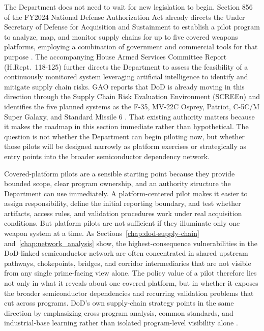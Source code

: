 The Department does not need to wait for new legislation to begin. Section 856 of the FY2024 National Defense Authorization Act already directs the Under Secretary of Defense for Acquisition and Sustainment to establish a pilot program to analyze, map, and monitor supply chains for up to five covered weapons platforms, employing a combination of government and commercial tools for that purpose \parencite{ch5_ndaa2024_sec856}. The accompanying House Armed Services Committee Report (H.Rept.\ 118-125) further directs the Department to assess the feasibility of a continuously monitored system leveraging artificial intelligence to identify and mitigate supply chain risks. GAO reports that DoD is already moving in this direction through the Supply Chain Risk Evaluation Environment (SCREEn) and identifies the five planned systems as the F-35, MV-22C Osprey, Patriot, C-5C/M Super Galaxy, and Standard Missile 6 \parencite{U.S.GovernmentAccountabilityOffice2025}. That existing authority matters because it makes the roadmap in this section immediate rather than hypothetical. The question is not whether the Department can begin piloting now, but whether those pilots will be designed narrowly as platform exercises or strategically as entry points into the broader semiconductor dependency network.

Covered-platform pilots are a sensible starting point because they provide bounded scope, clear program ownership, and an authority structure the Department can use immediately. A platform-centered pilot makes it easier to assign responsibility, define the initial reporting boundary, and test whether artifacts, access rules, and validation procedures work under real acquisition conditions. But platform pilots are not sufficient if they illuminate only one weapon system at a time. As Sections~\ref{chap:dod-supply-chain} and~\ref{chap:network_analysis} show, the highest-consequence vulnerabilities in the DoD-linked semiconductor network are often concentrated in shared upstream pathways, chokepoints, bridges, and corridor intermediaries that are not visible from any single prime-facing view alone. The policy value of a pilot therefore lies not only in what it reveals about one covered platform, but in whether it exposes the broader semiconductor dependencies and recurring validation problems that cut across programs. DoD's own supply-chain strategy points in the same direction by emphasizing cross-program analysis, common standards, and industrial-base learning rather than isolated program-level visibility alone \parencite{ch5_dod2022_supplychains,U.S.GovernmentAccountabilityOffice2025}.

